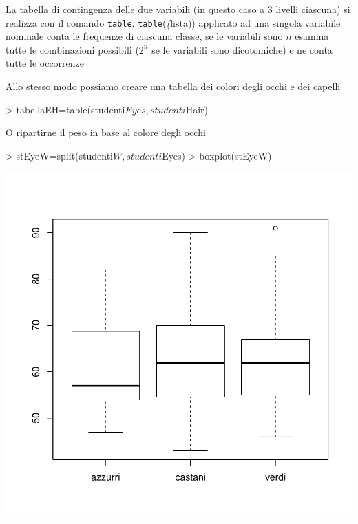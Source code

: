 \documentclass[onecolumn,11pt]{book}
\newcommand{\varia}[1]{\textsl{\textsf{#1}}}
\begin{document}
La tabella di contingenza delle due variabili (in questo caso a 3  livelli ciascuna) si realizza con il comando 
\texttt{table}. 
\texttt{table}(\varia(lista)) 
applicato ad una singola variabile nominale conta le frequenze di ciascuna classe, se le variabili sono $n$ esamina tutte le combinazioni possibili ($2^n$ se le variabili sono dicotomiche) e ne conta tutte le occorrenze
  
Allo stesso modo possiamo creare una tabella dei colori degli occhi e dei capelli
\begin{Schunk}
\begin{Sinput}
> tabellaEH=table(studenti$Eyes,studenti$Hair)
\end{Sinput}
\end{Schunk}
O ripartirne il peso in base al colore degli occhi
\begin{Schunk}
\begin{Sinput}
> stEyeW=split(studenti$W,studenti$Eyes)
> boxplot(stEyeW)
\end{Sinput}
\end{Schunk}
\includegraphics{statisticaconR-280}
\end{document}
